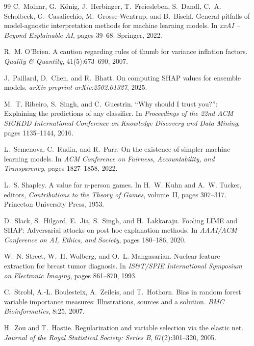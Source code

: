 \documentclass[11pt]{article}
\begin{document}
\begin{thebibliography}{99}
C.~Molnar, G.~K{\"o}nig, J.~Herbinger, T.~Freiesleben, S.~Dandl,
  C.~A. Scholbeck, G.~Casalicchio, M.~Grosse-Wentrup, and B.~Bischl.
\newblock General pitfalls of model-agnostic interpretation methods for
  machine learning models.
\newblock In \emph{xxAI -- Beyond Explainable AI}, pages 39--68. Springer,
  2022.

R.~M. O'Brien.
\newblock A caution regarding rules of thumb for variance inflation factors.
\newblock \emph{Quality \& Quantity}, 41(5):673--690, 2007.

J.~Paillard, D.~Chen, and R.~Bhatt.
\newblock On computing {SHAP} values for ensemble models.
\newblock \emph{arXiv preprint arXiv:2502.01327}, 2025.

M.~T. Ribeiro, S.~Singh, and C.~Guestrin.
\newblock ``{W}hy should {I} trust you?'': Explaining the predictions of any
  classifier.
\newblock In \emph{Proceedings of the 22nd ACM SIGKDD International Conference
  on Knowledge Discovery and Data Mining}, pages 1135--1144, 2016.

L.~Semenova, C.~Rudin, and R.~Parr.
\newblock On the existence of simpler machine learning models.
\newblock In \emph{ACM Conference on Fairness, Accountability, and
  Transparency}, pages 1827--1858, 2022.

L.~S. Shapley.
\newblock A value for n-person games.
\newblock In H.~W. Kuhn and A.~W. Tucker, editors, \emph{Contributions to the
  Theory of Games}, volume~II, pages 307--317. Princeton University Press, 1953.

D.~Slack, S.~Hilgard, E.~Jia, S.~Singh, and H.~Lakkaraju.
\newblock Fooling {LIME} and {SHAP}: Adversarial attacks on post hoc
  explanation methods.
\newblock In \emph{AAAI/ACM Conference on AI, Ethics, and Society}, pages
  180--186, 2020.

W.~N. Street, W.~H. Wolberg, and O.~L. Mangasarian.
\newblock Nuclear feature extraction for breast tumor diagnosis.
\newblock In \emph{IS\&T/SPIE International Symposium on Electronic Imaging},
  pages 861--870, 1993.

C.~Strobl, A.-L. Boulesteix, A.~Zeileis, and T.~Hothorn.
\newblock Bias in random forest variable importance measures: Illustrations,
  sources and a solution.
\newblock \emph{BMC Bioinformatics}, 8:25, 2007.

H.~Zou and T.~Hastie.
\newblock Regularization and variable selection via the elastic net.
\newblock \emph{Journal of the Royal Statistical Society: Series B},
  67(2):301--320, 2005.

\end{thebibliography}
\end{document}
